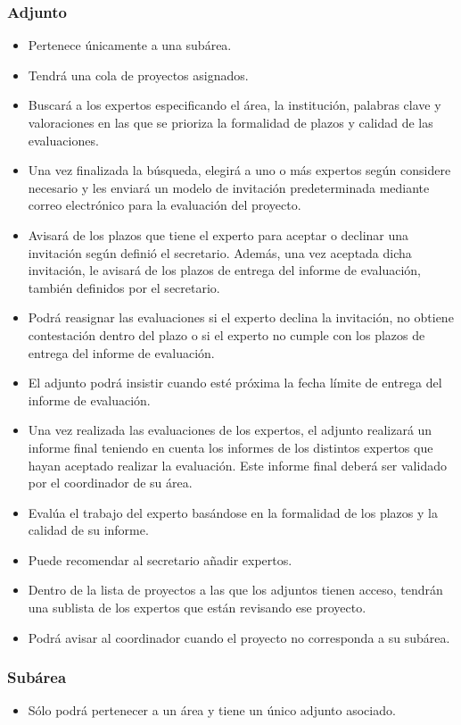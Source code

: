 \documentclass[12pt,a4paper,spanish,twoside]{article}
\begin{document}
\subsubsection{Adjunto}
\begin{itemize}
\item Pertenece únicamente a una subárea.
\item Tendrá una cola de proyectos asignados.
\item Buscará a los expertos especificando el área, la institución, palabras
  clave y valoraciones en las que se prioriza la formalidad de plazos y
  calidad de las evaluaciones. 
\item Una vez finalizada la búsqueda, elegirá a uno o más expertos según
  considere necesario y les enviará un modelo de invitación predeterminada
  mediante correo electrónico para la  evaluación del proyecto.  
\item Avisará de los plazos que tiene el experto para aceptar o declinar una
  invitación según definió el secretario. Además, una vez aceptada dicha
  invitación, le avisará de los plazos de entrega del informe de evaluación,
  también definidos por el secretario. 
\item Podrá reasignar las evaluaciones si el experto declina la invitación,
  no obtiene contestación dentro del plazo o si el experto no cumple con los
  plazos de entrega del informe de evaluación.
\item El adjunto podrá insistir cuando esté próxima la fecha límite de
  entrega del informe de evaluación. 
\item Una vez realizada las evaluaciones de los expertos, el adjunto
  realizará un informe final teniendo en cuenta los informes de los distintos
  expertos que hayan aceptado realizar la evaluación. Este informe final
  deberá ser validado por el coordinador de su área. 
\item Evalúa el trabajo del experto basándose en la formalidad de los plazos
  y la calidad de su informe. 
\item Puede recomendar al secretario añadir expertos.
\item Dentro de la lista de proyectos a las que los adjuntos tienen acceso,
  tendrán una sublista de los expertos que están revisando ese proyecto. 
\item Podrá avisar al coordinador cuando el proyecto no corresponda a su
  subárea. 
\end{itemize}

\subsubsection{Subárea}
\begin{itemize}
\item Sólo podrá pertenecer a un área y tiene un único adjunto asociado.
\end{itemize}
\end{document}
